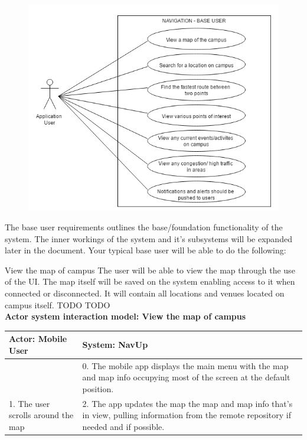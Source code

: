 \begin{figure} 
  \includegraphics[width=\textwidth]{diagrams/Specific_Requirements/base_user_use_case.png}
\end{figure}
The base user requirements outlines the base/foundation functionality of the system. The inner workings of the system and it's subsystems will be expanded later in the document. Your typical base user will be able to do the following:
\\
\bigskip

\FuncReq
{View the map of campus}
{The user will be able to view the map through the use of the UI. The map itself will be saved on the system enabling access to it when connected or disconnected. It will contain all locations and venues located on campus itself.}
{TODO}
{TODO}
    \\
    \textbf{Actor system interaction model: View the map of campus }\\
    \begin{tabular}{ | p{6cm} | p{6cm} |}
    \hline
    Actor: Mobile User & System: NavUp \\ \hline
     & 0. The mobile app displays the main menu with the map and map info occupying most of the screen at the default position.\\ \hline
    1. The user scrolls around the map & 2. The app updates the map the map and map info that's in view, pulling information from the remote repository if needed and if possible.\\ \hline
    
    \end{tabular}
\\
\bigskip

